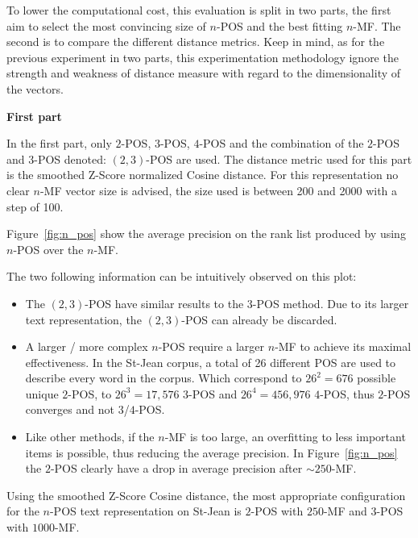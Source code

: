 To lower the computational cost, this evaluation is split in two parts, the first aim to select the most convincing size of $n$-POS and the best fitting $n$-MF.
The second is to compare the different distance metrics.
Keep in mind, as for the previous experiment in two parts, this experimentation methodology ignore the strength and weakness of distance measure with regard to the dimensionality of the vectors.

\textbf{First part}

In the first part, only $2$-POS, $3$-POS, $4$-POS and the combination of the $2$-POS and $3$-POS denoted: $(2, 3)$-POS are used.
The distance metric used for this part is the smoothed Z-Score normalized Cosine distance.
For this representation no clear $n$-MF vector size is advised, the size used is between 200 and 2000 with a step of 100.

Figure~\ref{fig:n_pos} show the average precision on the rank list produced by using $n$-POS over the $n$-MF.

The two following information can be intuitively observed on this plot:
\begin{itemize}
  \item
  The $(2, 3)$-POS have similar results to the $3$-POS method.
  Due to its larger text representation, the $(2, 3)$-POS can already be discarded.
  \item
  A larger / more complex $n$-POS require a larger $n$-MF to achieve its maximal effectiveness.
  In the St-Jean corpus, a total of 26 different POS are used to describe every word in the corpus.
  Which correspond to $26^2 = 676$ possible unique $2$-POS, to $26^3 = 17,576$ $3$-POS and $26^4 = 456,976$ $4$-POS, thus $2$-POS converges and not $3$/$4$-POS.
  \item
  Like other methods, if the $n$-MF is too large, an overfitting to less important items is possible, thus reducing the average precision.
  In Figure~\ref{fig:n_pos} the $2$-POS clearly have a drop in average precision after $\sim 250$-MF.
\end{itemize}

Using the smoothed Z-Score Cosine distance, the most appropriate configuration for the $n$-POS text representation on St-Jean is $2$-POS with $250$-MF and $3$-POS with $1000$-MF.

